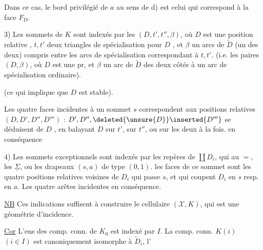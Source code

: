 Dans ce cas, le bord privilégié de $a$ au sens de d) est celui qui correspond à la face $F_D$.

3) Les sommets  de $K$ sont indexés par les  $(D,t',t'',\beta)$, où $D$ est une position relative , $t,t'$ deux triangles de spécialisation pour $D$ , et $\beta$  un  arcs de $\widetilde D$ (un des deux) compris entre les arcs de spécialisation  correspondant à $t,t'$. (i.e. les  paires $(D,\beta)$, où $D$ est une pr, et $\beta$ un arc de $\widetilde D$   des deux côtés à un arc de spécialisation ordinaire).


(ce qui implique que $D$ est stable).

 Les quatre faces incidentes à un sommet $s$ correspondent aux positions relatives $(D,D',D'',D''')$ : $D',D'',\deleted{\unsure{D}}\inserted{D'''}$ se déduisent de $D$ , en balayant $D$ sur $t'$, \deleted{$\unsure{\Sigma}$} sur $t''$,  ou sur les deux à la fois.  en conséquence

4) Les sommets exceptionnels sont indexés par les repères de $\coprod D_i$,   qui  au $=$, les    $\underline\Sigma$,  ou les drapeaux $(s,a)$ de type $(0,1)$.  les  faces  de ce sommet sont les quatre positions relatives voisines de $D_i$  qui passe $s$, et qui  coupent $D_i$ en $s$ resp. en $a$. Les quatre arêtes incidentes en conséquence.

\uline{NB} Ces indications suffisent à construire le  cellulaire $(\mathcal X,K)$, qui est une géométrie d'incidence.

\uline{Cor} L'ens des comp. conn. de $K_0$ est indexé par $I$. La  comp. conn. $K(i)$ $(i\in I)$ est canoniquement isomorphe à  $\widetilde D_i$, l'
